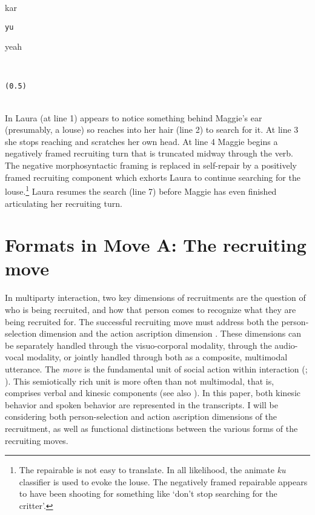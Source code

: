 \documentclass[output=paper,nonflat,colorlinks,citecolor=brown]{langsci/langscibook}
\begin{document}
%
\begin{transbox}{8}{kar}
\begin{verbatim}
yu
\end{verbatim}
yeah
\end{transbox}
%
\begin{transbox}{9}{~}
\begin{verbatim}
(0.5)
\end{verbatim}
\end{transbox}\\

In  Laura (at line 1) appears to notice something behind Maggie’s ear (presumably, a louse) so reaches into her hair (line 2) to search for it. At line 3 she stops reaching and scratches her own head.  At line 4 Maggie begins a negatively framed recruiting turn that is truncated midway through the verb. The negative morphosyntactic framing is replaced in self-repair by a positively framed recruiting component which exhorts Laura to continue searching for the louse.\footnote{The repairable is not easy to translate. In all likelihood, the animate \textit{ku} classifier is used to evoke the louse. The negatively framed repairable appears to have been shooting for something like ‘don’t stop searching for the critter’.} Laura resumes the search (line 7) before Maggie has even finished articulating her recruiting turn.

\section{Formats in Move A: The recruiting move}\label{sec:blythe:3}

In multiparty interaction, two key dimensions of recruitments are the question of who is being recruited, and how that person comes to recognize what they are being recruited for. The successful recruiting move must address both the person-selection dimension \citep{Lerner2003} and the action ascription dimension \citep{Levinson2013}. These dimensions can be separately handled through the visuo-corporal modality, through the audio-vocal modality, or jointly handled through both as a composite, multimodal utterance. The \textit{move} is the fundamental unit of social action within interaction (\citealt{Enfield2009}; \citealt{Goffman1981}). This semiotically rich unit is more often than not multimodal, that is, comprises verbal and kinesic components (see also \citealt{Kendon2004}). In this paper, both kinesic behavior and spoken behavior are represented in the transcripts. I will be considering both person-selection and action ascription dimensions of the recruitment, as well as functional distinctions between the various forms of the recruiting moves.
\end{document}
